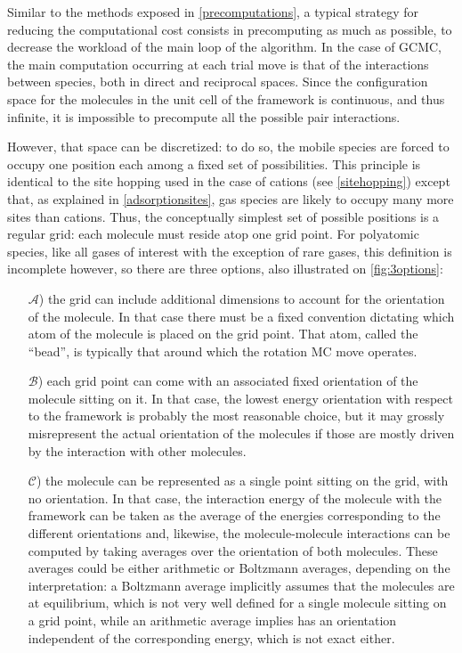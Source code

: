 \documentclass[main.tex]{subfiles}
\begin{document}
Similar to the methods exposed in \cref{precomputations}, a typical strategy for reducing the computational cost consists in precomputing as much as possible, to decrease the workload of the main loop of the algorithm. In the case of GCMC, the main computation occurring at each trial move is that of the interactions between species, both in direct and reciprocal spaces. Since the configuration space for the molecules in the unit cell of the framework is continuous, and thus infinite, it is impossible to precompute all the possible pair interactions.

However, that space can be discretized: to do so, the mobile species are forced to occupy one position each among a fixed set of possibilities. This principle is identical to the site hopping used in the case of cations (see \cref{sitehopping}) except that, as explained in \cref{adsorptionsites}, gas species are likely to occupy many more sites than cations. Thus, the conceptually simplest set of possible positions is a regular grid: each molecule must reside atop one grid point. For polyatomic species, like all gases of interest with the exception of rare gases, this definition is incomplete however, so there are three options, also illustrated on \cref{fig:3options}:
\begin{enumerate}
	\item[$\mathscr A$)] the grid can include additional dimensions to account for the orientation of the molecule. In that case there must be a fixed convention dictating which atom of the molecule is placed on the grid point. That atom, called the ``bead'', is typically that around which the rotation MC move operates.
	\item[$\mathscr B$)] each grid point can come with an associated fixed orientation of the molecule sitting on it. In that case, the lowest energy orientation with respect to the framework is probably the most reasonable choice, but it may grossly misrepresent the actual orientation of the molecules if those are mostly driven by the interaction with other molecules.
	\item[$\mathscr C$)] the molecule can be represented as a single point sitting on the grid, with no orientation. In that case, the interaction energy of the molecule with the framework can be taken as the average of the energies corresponding to the different orientations and, likewise, the molecule-molecule interactions can be computed by taking averages over the orientation of both molecules. These averages could be either arithmetic or Boltzmann averages, depending on the interpretation: a Boltzmann average implicitly assumes that the molecules are at equilibrium, which is not very well defined for a single molecule sitting on a grid point, while an arithmetic average implies has an orientation independent of the corresponding energy, which is not exact either.
\end{enumerate}
\end{document}
